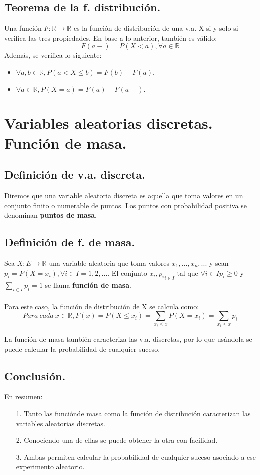 \subsection{Teorema de la f. distribución.}
Una función $F:\mathbb{R} \to \mathbb{R}$ es la función de distribución de una v.a. X si y solo si verifica las tres propiedades. En base a lo anterior, también es válido:
\[F(a-) = P(X<a), \forall a \in \mathbb{R}\]
Además, se verifica lo siguiente:
\begin{itemize}
\item $\forall a,b \in \mathbb{R}, P(a < X \leq b)=F(b)-F(a)$.
\item $\forall a \in \mathbb{R}, P(X=a)=F(a)-F(a-)$.
\end{itemize}


\section{Variables aleatorias discretas. Función de masa.}
\subsection{Definición de v.a. discreta.}
Diremos que una variable aleatoria discreta es aquella que toma valores en un conjunto finito o numerable de puntos. Los puntos con probabilidad positiva se denominan \textbf{puntos de masa}.

\subsection{Definición de f. de masa.}
Sea $X: E \to \mathbb{R}$ una variable aleatoria que toma valores ${x_{1},...,x_{n},...}$ y sean $p_{i} = P(X=x_{i}), \forall i \in I = {1,2,...}$. El conjunto ${x_{i}, p_{i}}_{i \in I}$ tal que $\forall i \in I p_{i} \geq 0$ y $\sum_{i \in I} p_{i} = 1$ se llama \textbf{función de masa}.

\paragraph{}
Para este caso, la función de distribución de X se calcula como:
\[Para\: cada\: x \in \mathbb{R}, F(x)=P(X \leq x_{i}) = \sum_{x_{i} \leq x} P(X=x_{i}) = \sum_{x_{i} \leq x} p_{i}\]

La función de masa también caracteriza las v.a. discretas, por lo que usándola se puede calcular la probabilidad de cualquier suceso.

\subsection{Conclusión.}
En resumen:
\begin{itemize}
\item[1.]Tanto las funciónde masa como la función de distribución caracterizan las variables aleatorias discretas.
\item[2.]Conociendo una de ellas se puede obtener la otra con facilidad.
\item[3.]Ambas permiten calcular la probabilidad de cualquier suceso asociado a ese experimento aleatorio.
\end{itemize}


